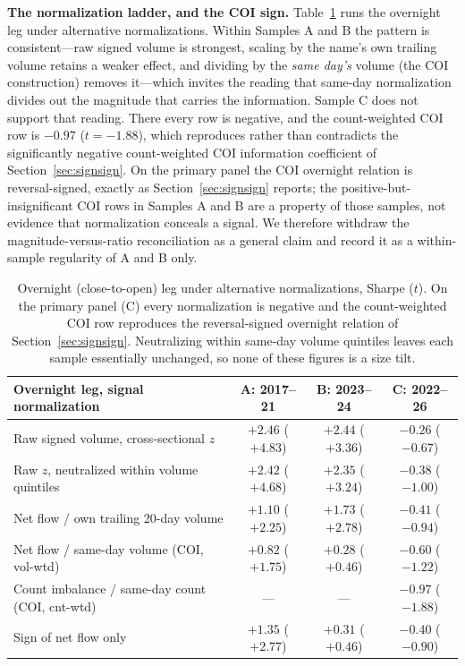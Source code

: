 \documentclass[11pt]{article}
\begin{document}
\textbf{The normalization ladder, and the COI sign.} Table~\ref{tab:tugofwar_norm} runs the overnight leg under alternative normalizations. Within Samples A and B the pattern is consistent---raw signed volume is strongest, scaling by the name's own trailing volume retains a weaker effect, and dividing by the \emph{same day's} volume (the COI construction) removes it---which invites the reading that same-day normalization divides out the magnitude that carries the information. Sample C does not support that reading. There every row is negative, and the count-weighted COI row is $-0.97$ ($t=-1.88$), which reproduces rather than contradicts the significantly negative count-weighted COI information coefficient of Section~\ref{sec:signsign}. On the primary panel the COI overnight relation is reversal-signed, exactly as Section~\ref{sec:signsign} reports; the positive-but-insignificant COI rows in Samples A and B are a property of those samples, not evidence that normalization conceals a signal. We therefore withdraw the magnitude-versus-ratio reconciliation as a general claim and record it as a within-sample regularity of A and B only.

\begin{table}[htbp]
\centering
\begin{tabular}{lccc}
\toprule
\textbf{Overnight leg, signal normalization} & \textbf{A: 2017--21} & \textbf{B: 2023--24} & \textbf{C: 2022--26} \\
\midrule
Raw signed volume, cross-sectional $z$        & $+2.46$ ($+4.83$) & $+2.44$ ($+3.36$) & $-0.26$ ($-0.67$) \\
Raw $z$, neutralized within volume quintiles  & $+2.42$ ($+4.68$) & $+2.35$ ($+3.24$) & $-0.38$ ($-1.00$) \\
Net flow / own trailing 20-day volume          & $+1.10$ ($+2.25$) & $+1.73$ ($+2.78$) & $-0.41$ ($-0.94$) \\
Net flow / same-day volume (COI, vol-wtd)      & $+0.82$ ($+1.75$) & $+0.28$ ($+0.46$) & $-0.60$ ($-1.22$) \\
Count imbalance / same-day count (COI, cnt-wtd) & --- & --- & $-0.97$ ($-1.88$) \\
Sign of net flow only                          & $+1.35$ ($+2.77$) & $+0.31$ ($+0.46$) & $-0.40$ ($-0.90$) \\
\bottomrule
\end{tabular}
\caption{Overnight (close-to-open) leg under alternative normalizations, Sharpe ($t$). On the primary panel (C) every normalization is negative and the count-weighted COI row reproduces the reversal-signed overnight relation of Section~\ref{sec:signsign}. Neutralizing within same-day volume quintiles leaves each sample essentially unchanged, so none of these figures is a size tilt.}
\label{tab:tugofwar_norm}
\end{table}
\end{document}
